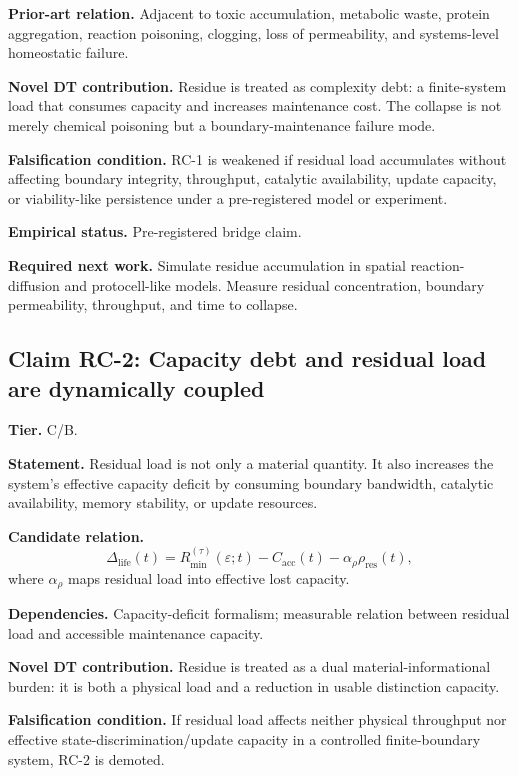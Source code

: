 \documentclass[10pt,a4paper,twocolumn,aps,prl]{revtex4-2}
\theoremstyle{claimstyle}
\theoremstyle{definition}
\newcommand{\claimfield}[1]{\noindent\textbf{#1.}}
\newcommand{\rhodebt}{\rho_{\mathrm{res}}}
\newcommand{\Cacc}{C_{\mathrm{acc}}}
\begin{document}
\claimfield{Prior-art relation} Adjacent to toxic accumulation, metabolic waste, protein aggregation, reaction poisoning, clogging, loss of permeability, and systems-level homeostatic failure.

\claimfield{Novel DT contribution} Residue is treated as complexity debt: a finite-system load that consumes capacity and increases maintenance cost. The collapse is not merely chemical poisoning but a boundary-maintenance failure mode.

\claimfield{Falsification condition} RC-1 is weakened if residual load accumulates without affecting boundary integrity, throughput, catalytic availability, update capacity, or viability-like persistence under a pre-registered model or experiment.

\claimfield{Empirical status} Pre-registered bridge claim.

\claimfield{Required next work} Simulate residue accumulation in spatial reaction-diffusion and protocell-like models. Measure residual concentration, boundary permeability, throughput, and time to collapse.

\subsection{Claim RC-2: Capacity debt and residual load are dynamically coupled}

\claimfield{Tier} C/B.

\claimfield{Statement} Residual load is not only a material quantity. It also increases the system's effective capacity deficit by consuming boundary bandwidth, catalytic availability, memory stability, or update resources.

\claimfield{Candidate relation}
\begin{equation}
\Delta_{\mathrm{life}}(t)=R_{\min}^{(\tau)}(\varepsilon;t)-\Cacc(t)-\alpha_\rho \rhodebt(t),
\end{equation}
where $\alpha_\rho$ maps residual load into effective lost capacity.

\claimfield{Dependencies} Capacity-deficit formalism; measurable relation between residual load and accessible maintenance capacity.

\claimfield{Novel DT contribution} Residue is treated as a dual material-informational burden: it is both a physical load and a reduction in usable distinction capacity.

\claimfield{Falsification condition} If residual load affects neither physical throughput nor effective state-discrimination/update capacity in a controlled finite-boundary system, RC-2 is demoted.
\end{document}
